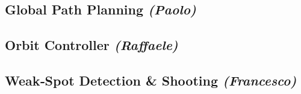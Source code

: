 \subsection{Global Path Planning \emph{(Paolo)}}\label{sec:planner}


\subsection{Orbit Controller \emph{(Raffaele)}}\label{sec:orbit}


\subsection{Weak‑Spot Detection \& Shooting \emph{(Francesco)}}\label{sec:shooter}
